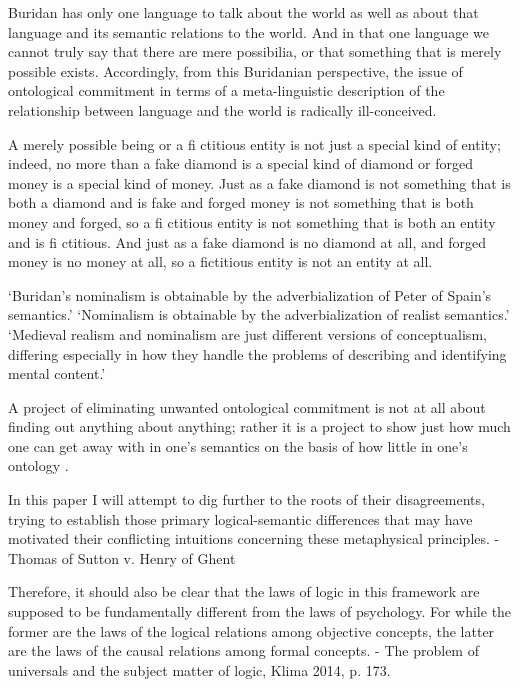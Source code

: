 \documentclass[]{article}
\begin{document}
Buridan has only one language to talk about the world as well as about that
language and its semantic relations to the world. And in that one language
we cannot truly say that there are mere possibilia, or that something that is
merely possible exists. Accordingly, from this Buridanian perspective, the
issue of ontological commitment in terms of a meta-linguistic description of
the relationship between language and the world is radically ill-conceived.\autocite[172]{Klima2009}

A merely possible being or a ﬁ ctitious entity is not just
a special kind of entity; indeed, no more than a fake diamond is a special
kind of diamond or forged money is a special kind of money. Just as a fake
diamond is not something that is both a diamond and is fake and forged
money is not something that is both money and forged, so a ﬁ ctitious entity
is not something that is both an entity and is ﬁ ctitious. And just as a fake
diamond is no diamond at all, and forged money is no money at all, so a
ﬁctitious entity is not an entity at all.\autocite[173]{Klima2009}

`Buridan’s nominalism is obtainable by the adverbialization of Peter
of Spain’s semantics.'
`Nominalism is obtainable by the adverbialization of realist
semantics.'
`Medieval realism and nominalism are just different versions of conceptualism, differing especially in how they handle the problems of
describing and identifying mental content.'\autocite[110]{Klima2011}

A project of eliminating unwanted
ontological commitment is not at all about finding out anything about anything;
rather it is a project to show just how much one can get away with in one’s
semantics on the basis of how little in one’s ontology \autocite[412]{Klima2012}.

In this paper I will attempt to dig further to the roots of
their disagreements, trying to establish those primary logical-semantic differences that may have
motivated their conflicting intuitions concerning these metaphysical principles. - Thomas of Sutton v. Henry of Ghent

Therefore, it should also be clear that the laws of logic in this framework
are supposed to be fundamentally diﬀerent from the laws of psychology.
For while the former are the laws of the logical relations among objective
concepts, the latter are the laws of the causal relations among formal
concepts. - The problem of universals and the subject matter of logic, Klima 2014, p. 173.
\end{document}

